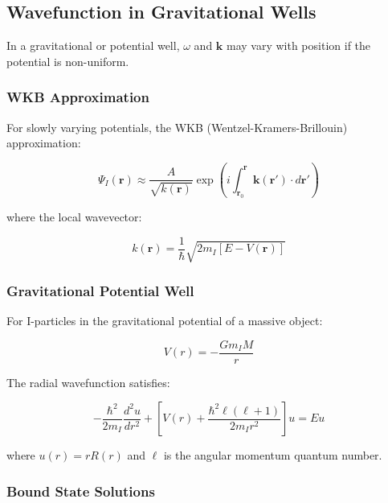 \subsection{Wavefunction in Gravitational Wells}

In a gravitational or potential well, $\omega$ and $\mathbf{k}$ may vary with position if the potential is non-uniform.

\subsubsection{WKB Approximation}

For slowly varying potentials, the WKB (Wentzel-Kramers-Brillouin) approximation:

\begin{equation}
\label{eq:wkb_wavefunction}
\Psi_I(\mathbf{r}) \approx \frac{A}{\sqrt{k(\mathbf{r})}} \exp\left(i\int_{\mathbf{r}_0}^{\mathbf{r}} \mathbf{k}(\mathbf{r}') \cdot d\mathbf{r}'\right)
\end{equation}

where the local wavevector:

\begin{equation}
\label{eq:local_wavevector}
k(\mathbf{r}) = \frac{1}{\hbar}\sqrt{2m_I[E - V(\mathbf{r})]}
\end{equation}

\subsubsection{Gravitational Potential Well}

For I-particles in the gravitational potential of a massive object:

\begin{equation}
\label{eq:gravitational_well}
V(r) = -\frac{Gm_I M}{r}
\end{equation}

The radial wavefunction satisfies:

\begin{equation}
\label{eq:radial_schrodinger}
-\frac{\hbar^2}{2m_I}\frac{d^2u}{dr^2} + \left[V(r) + \frac{\hbar^2\ell(\ell+1)}{2m_I r^2}\right]u = E u
\end{equation}

where $u(r) = r R(r)$ and $\ell$ is the angular momentum quantum number.

\subsubsection{Bound State Solutions}

